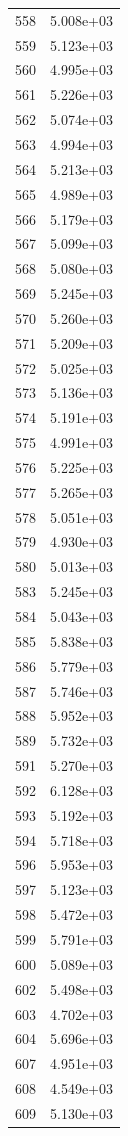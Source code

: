 \documentclass[12pt]{article}
\begin{document}
\begin{longtable}{@{}cc@{}}
558 & 5.008e+03 \\
559 & 5.123e+03 \\
560 & 4.995e+03 \\
561 & 5.226e+03 \\
562 & 5.074e+03 \\
563 & 4.994e+03 \\
564 & 5.213e+03 \\
565 & 4.989e+03 \\
566 & 5.179e+03 \\
567 & 5.099e+03 \\
568 & 5.080e+03 \\
569 & 5.245e+03 \\
570 & 5.260e+03 \\
571 & 5.209e+03 \\
572 & 5.025e+03 \\
573 & 5.136e+03 \\
574 & 5.191e+03 \\
575 & 4.991e+03 \\
576 & 5.225e+03 \\
577 & 5.265e+03 \\
578 & 5.051e+03 \\
579 & 4.930e+03 \\
580 & 5.013e+03 \\
583 & 5.245e+03 \\
584 & 5.043e+03 \\
585 & 5.838e+03 \\
586 & 5.779e+03 \\
587 & 5.746e+03 \\
588 & 5.952e+03 \\
589 & 5.732e+03 \\
591 & 5.270e+03 \\
592 & 6.128e+03 \\
593 & 5.192e+03 \\
594 & 5.718e+03 \\
596 & 5.953e+03 \\
597 & 5.123e+03 \\
598 & 5.472e+03 \\
599 & 5.791e+03 \\
600 & 5.089e+03 \\
602 & 5.498e+03 \\
603 & 4.702e+03 \\
604 & 5.696e+03 \\
607 & 4.951e+03 \\
608 & 4.549e+03 \\
609 & 5.130e+03 \\

\end{longtable}
\end{document}
